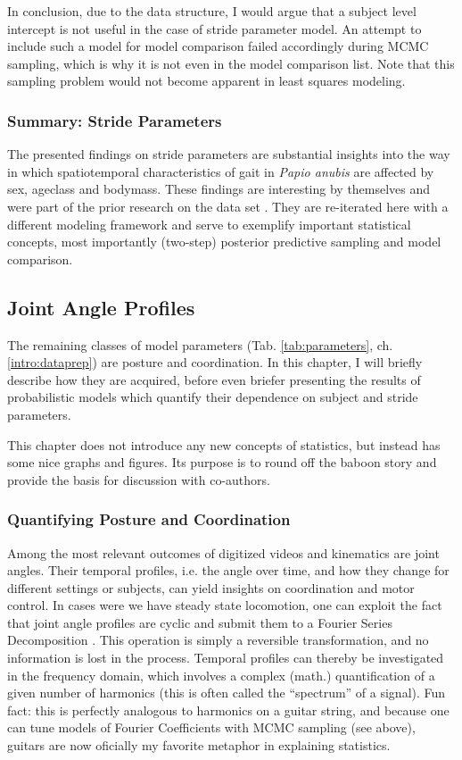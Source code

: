 In conclusion, due to the data structure, I would argue that a subject level intercept is not useful in the case of stride parameter model.
An attempt to include such a model for model comparison failed accordingly during MCMC sampling, which is why it is not even in the model comparison list.
Note that this sampling problem would not become apparent in least squares modeling.


\subsubsection{Summary: Stride Parameters}
\label{sec:org0d94e4f}
The presented findings on stride parameters are substantial insights into the way in which spatiotemporal characteristics of gait in \emph{Papio anubis} are affected by sex, ageclass and bodymass.
These findings are interesting by themselves and were part of the prior research on the data set \citep[][]{Druelle2021}.
They are re-iterated here with a different modeling framework and serve to exemplify important statistical concepts, most importantly (two-step) posterior predictive sampling and model comparison.

\clearpage
\subsection{Joint Angle Profiles}
\label{sec:orgc82aa48}
The remaining classes of model parameters (Tab. \ref{tab:parameters}, ch. \ref{intro:dataprep}) are posture and coordination.
In this chapter, I will briefly describe how they are acquired, before even briefer presenting the results of probabilistic models which quantify their dependence on subject and stride parameters.


This chapter does not introduce any new concepts of statistics, but instead has some nice graphs and figures.
Its purpose is to round off the baboon story and provide the basis for discussion with co-authors.


\subsubsection{Quantifying Posture and Coordination}
\label{sec:orgb18a99b}
Among the most relevant outcomes of digitized videos and kinematics are joint angles.
Their temporal profiles, i.e. the angle over time, and how they change for different settings or subjects, can yield insights on coordination and motor control.
In cases were we have steady state locomotion, one can exploit the fact that joint angle profiles are cyclic and submit them to a Fourier Series Decomposition \citep[cf.][]{Mielke2019}.
This operation is simply a reversible transformation, and no information is lost in the process.
Temporal profiles can thereby be investigated in the frequency domain, which involves a complex (math.) quantification of a given number of harmonics (this is often called the ``spectrum'' of a signal).
Fun fact: this is perfectly analogous to harmonics on a guitar string, and because one can tune models of Fourier Coefficients with MCMC sampling (see above), guitars are now oficially my favorite metaphor in explaining statistics.

